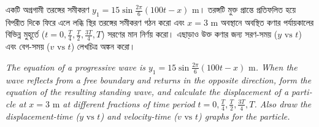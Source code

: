 \documentclass[12pt, a4paper]{article}
\begin{document}
\newpage
\begin{tcolorbox}[questionbox={প্রশ্ন (Question) 1}]
\noindent
একটি অগ্রগামী তরঙ্গের সমীকরণ $y_1 = 15 \sin \frac{2\pi}{6}(100t - x)\text{ m}$। তরঙ্গটি মুক্ত প্রান্তে প্রতিফলিত হয়ে বিপরীত দিকে ফিরে এলে লব্ধি স্থির তরঙ্গের সমীকরণ গঠন করো এবং $x = 3\text{ m}$ অবস্থানে অবস্থিত কণার পর্যায়কালের বিভিন্ন মুহূর্তে ($t = 0, \frac{T}{4}, \frac{T}{2}, \frac{3T}{4}, T$) সরণের মান নির্ণয় করো। এছাড়াও উক্ত কণার জন্য সরণ-সময় ($y\text{ vs }t$) এবং বেগ-সময় ($v\text{ vs }t$) লেখচিত্র অঙ্কন করো।

\vspace{0.8em}
\begin{english}
\noindent\textit{\color{darkgray}
The equation of a progressive wave is $y_1 = 15 \sin \frac{2\pi}{6}(100t - x)\text{ m}$. When the wave reflects from a free boundary and returns in the opposite direction, form the equation of the resulting standing wave, and calculate the displacement of a particle at $x = 3\text{ m}$ at different fractions of time period $t = 0, \frac{T}{4}, \frac{T}{2}, \frac{3T}{4}, T$. Also draw the displacement-time ($y\text{ vs }t$) and velocity-time ($v\text{ vs }t$) graphs for the particle.
}
\end{english}
\end{tcolorbox}

\vspace{1em}
\end{document}
